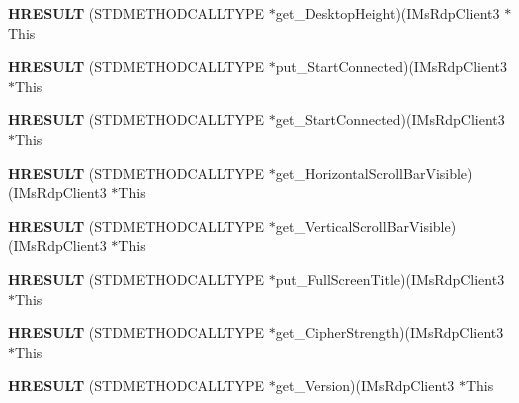 \begin{DoxyCompactItemize}
{\bfseries H\+R\+E\+S\+U\+LT} (S\+T\+D\+M\+E\+T\+H\+O\+D\+C\+A\+L\+L\+T\+Y\+PE $\ast$get\+\_\+\+Desktop\+Height)(I\+Ms\+Rdp\+Client3 $\ast$This
\item 
\mbox{\label{struct_i_ms_rdp_client3_vtbl_a22cd373f2423d9f96ebc30159693d379}} 
{\bfseries H\+R\+E\+S\+U\+LT} (S\+T\+D\+M\+E\+T\+H\+O\+D\+C\+A\+L\+L\+T\+Y\+PE $\ast$put\+\_\+\+Start\+Connected)(I\+Ms\+Rdp\+Client3 $\ast$This
\item 
\mbox{\label{struct_i_ms_rdp_client3_vtbl_ae7d508a50cfc0a3bcffe1934c2227314}} 
{\bfseries H\+R\+E\+S\+U\+LT} (S\+T\+D\+M\+E\+T\+H\+O\+D\+C\+A\+L\+L\+T\+Y\+PE $\ast$get\+\_\+\+Start\+Connected)(I\+Ms\+Rdp\+Client3 $\ast$This
\item 
\mbox{\label{struct_i_ms_rdp_client3_vtbl_a3d292de5b3efd05a2a168cb157d5fcb8}} 
{\bfseries H\+R\+E\+S\+U\+LT} (S\+T\+D\+M\+E\+T\+H\+O\+D\+C\+A\+L\+L\+T\+Y\+PE $\ast$get\+\_\+\+Horizontal\+Scroll\+Bar\+Visible)(I\+Ms\+Rdp\+Client3 $\ast$This
\item 
\mbox{\label{struct_i_ms_rdp_client3_vtbl_ac0968385e86c42726dec0205a50ff781}} 
{\bfseries H\+R\+E\+S\+U\+LT} (S\+T\+D\+M\+E\+T\+H\+O\+D\+C\+A\+L\+L\+T\+Y\+PE $\ast$get\+\_\+\+Vertical\+Scroll\+Bar\+Visible)(I\+Ms\+Rdp\+Client3 $\ast$This
\item 
\mbox{\label{struct_i_ms_rdp_client3_vtbl_a5b651f3cfdbea362ac74baee2a1f15c7}} 
{\bfseries H\+R\+E\+S\+U\+LT} (S\+T\+D\+M\+E\+T\+H\+O\+D\+C\+A\+L\+L\+T\+Y\+PE $\ast$put\+\_\+\+Full\+Screen\+Title)(I\+Ms\+Rdp\+Client3 $\ast$This
\item 
\mbox{\label{struct_i_ms_rdp_client3_vtbl_a35b1d6360c3fa2e36af8f30eb68eedf7}} 
{\bfseries H\+R\+E\+S\+U\+LT} (S\+T\+D\+M\+E\+T\+H\+O\+D\+C\+A\+L\+L\+T\+Y\+PE $\ast$get\+\_\+\+Cipher\+Strength)(I\+Ms\+Rdp\+Client3 $\ast$This
\item 
\mbox{\label{struct_i_ms_rdp_client3_vtbl_adfd07328f8e31ff95a76b335c2c8a985}} 
{\bfseries H\+R\+E\+S\+U\+LT} (S\+T\+D\+M\+E\+T\+H\+O\+D\+C\+A\+L\+L\+T\+Y\+PE $\ast$get\+\_\+\+Version)(I\+Ms\+Rdp\+Client3 $\ast$This
\item 

\end{DoxyCompactItemize}
